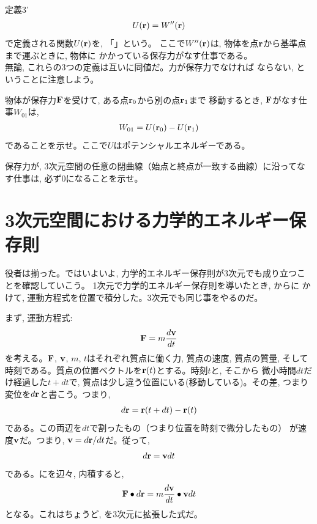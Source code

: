 定義3'
\begin{eqnarray}
U({\bf r})=W''({\bf r})\label{eq:2Dpotential3}
\end{eqnarray}
で定義される関数$U({\bf r})$を, 「」という。
ここで$W''({\bf r})$は, 物体を点${\bf r}$から基準点まで運ぶときに, 物体に
かかっている保存力がなす仕事である。\\

無論, これらの3つの定義は互いに同値だ。力が保存力でなければ
ならない, ということに注意しよう。\mv

%
\begin{q}\label{q:3D_work_conservative}
物体が保存力${\bf F}$を受けて, ある点${\bf r}_0$から別の点${\bf r}_1$まで
移動するとき, ${\bf F}$がなす仕事$W_{01}$は, 
\begin{eqnarray}
W_{01}=U({\bf r}_0)-U({\bf r}_1)\label{3D_work_conservative}
\end{eqnarray}
であることを示せ。ここで$U$はポテンシャルエネルギーである。
\end{q}
\vspace{0.1cm}

%
\begin{q}\label{q:work_conservative_loop}
保存力が, 3次元空間の任意の閉曲線（始点と終点が一致する曲線）に沿ってなす仕事は, 必ず0になることを示せ。
\end{q}
\vspace{0.6cm}



\section{3次元空間における力学的エネルギー保存則}

役者は揃った。ではいよいよ, 力学的エネルギー保存則が3次元でも成り立つことを確認していこう。
1次元で力学的エネルギー保存則を導いたとき, からに
かけて, 運動方程式を位置で積分した。3次元でも同じ事をやるのだ。

まず, 運動方程式:
\begin{eqnarray}
{\bf F}=m\frac{d{\bf v}}{dt}\label{eq:3D_cons_F_ma}
\end{eqnarray}
を考える。${\bf F}$, ${\bf v}$, $m$, $t$はそれぞれ質点に働く力, 質点の速度, 質点の質量, 
そして時刻である。質点の位置ベクトルを${\bf r}(t)$とする。時刻$t$と, そこから
微小時間$dt$だけ経過した$t+dt$で, 質点は少し違う位置にいる(移動している)。その差, 
つまり変位を$d{\bf r}$と書こう。つまり, 
\begin{eqnarray}
d{\bf r}={\bf r}(t+dt)-{\bf r}(t)
\end{eqnarray}
である。この両辺を$dt$で割ったもの（つまり位置を時刻で微分したもの）
が速度${\bf v}$だ。つまり, ${\bf v}=d{\bf r}/dt$だ。従って, 
\begin{eqnarray}
d{\bf r}={\bf v}dt\label{eq:3D_cons_dr_vdt}
\end{eqnarray}
である。にを辺々, 内積すると, 
\begin{eqnarray}
{\bf F}\bullet d{\bf r}=m\frac{d{\bf v}}{dt}\bullet {\bf v}dt\label{eq:3D_WandT000}
\end{eqnarray}
となる。これはちょうど, を3次元に拡張した式だ。\mv

